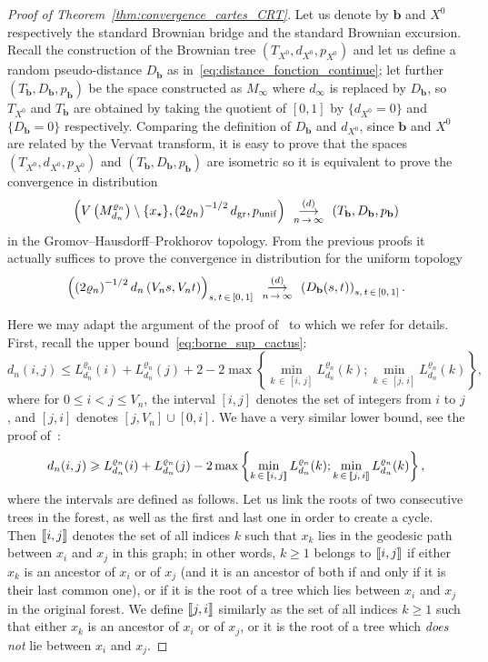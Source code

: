 \documentclass[10pt]{amsart}
\theoremstyle{definition}\newtheorem{defi}[theo]{Definition}\newtheorem{rema}[theo]{Remark}\newtheorem{exam}[theo]{Example}\newtheorem{exem}[theo]{Example}\newtheorem{nota}[theo]{Notation}
\newcommand{\llbracket}{\mathopen{[\mkern -2.7mu[}}
\newcommand{\rrbracket}{\mathclose{]\mkern -2.7mu]}}
\newcommand{\1}{\ensembles{1}}
\newcommand{\bb}{\mathbf{b}}
\renewcommand{\le}{\leqslant}
\renewcommand{\ge}{\geqslant}
\newcommand{\CRT}{T}
\newcommand{\dCRT}{d}
\newcommand{\pCRT}{p}
\newcommand{\mn}{M_{d_n}^{\varrho_n}}
\newcommand{\dgr}{d_{\mathrm{gr}}}
\newcommand{\pgr}{p_{\mathrm{unif}}}
\newcommand{\Lfn}{L_{d_n}^{\varrho_n}}
\newcommand{\vertices}{V}
\newcommand{\cvloi}[1][n]{\enskip\mathop{\longrightarrow}^{(d)}_{#1\,\to\, \infty}\enskip}
\providecommand{\?}{}
\begin{document}
\begin{proof}[Proof of Theorem~\ref{thm:convergence_cartes_CRT}]
Let us denote by $\bb$ and $X^0$ respectively the standard Brownian bridge and the standard Brownian excursion. Recall the construction of the Brownian tree $(\CRT_{X^0}, \dCRT_{X^0}, \pCRT_{X^0})$ and let us define a random pseudo-distance $D_{\bb}$ as in~\eqref{eq:distance_fonction_continue}; let further $(\CRT_{\bb}, D_{\bb}, p_{\bb})$ be the space constructed as $M_\infty$ where $d_\infty$ is replaced by $D_{\bb}$, so $\CRT_{X^0}$ and $\CRT_{\bb}$ are obtained by taking the quotient of $[0,1]$ by $\{\dCRT_{X^0} = 0\}$ and $\{D_{\bb} = 0\}$ respectively. Comparing the definition of $D_{\bb}$ and $\dCRT_{X^0}$, since $\bb$ and $X^0$ are related by the Vervaat transform, it is easy to prove that the spaces $(\CRT_{X^0}, \dCRT_{X^0}, \pCRT_{X^0})$ and $(\CRT_{\bb}, D_{\bb}, p_{\bb})$ are isometric so it is equivalent to prove the convergence in distribution
\[
\left(V\left(\mn\right)\setminus\{x_\star\}, \left(2\varrho_n\right)^{-1/2} \dgr, \pgr\right) \cvloi \left(\CRT_{\bb}, D_{\bb}, p_{\bb}\right)
\]
in the Gromov--Hausdorff--Prokhorov topology. From the previous proofs it actually suffices to prove the convergence in distribution for the uniform topology
\begin{equation}\label{eq:cv_distance_carte_arbre}
\left(\left(2\varrho_n\right)^{-1/2} d_n\left(\vertices_n s, \vertices_n t\right)\right)_{s,\,t \,\in\,[0,\,1]} \cvloi \left(D_{\bb}(s,t)\right)_{s,\,t \,\in\,[0,\,1]}.
\end{equation}

Here we may adapt the argument of the proof of~\cite[Theorem~5]{Bet15} to which we refer for details. First, recall the upper bound~\eqref{eq:borne_sup_cactus}:
\[
d_n(i,j) \le \Lfn(i) + \Lfn(j) + 2 - 2 \max\left\{\min_{k\,\in\,[i,\,j]} \Lfn(k); \min_{k\,\in\,[j,\,i]} \Lfn(k)\right\},
\]
where for $0 \le i < j \le \vertices_n$, the interval $[i, j]$ denotes the set of integers from $i$ to $j$, and $[j,i]$ denotes $[j, \vertices_n] \cup [0, i]$. We have a very similar lower bound, see the proof of~\cite[Corollary~4.4]{CLGM13}:
\begin{equation}\label{eq:borne_inf_cactus}
d_n(i,j) \ge \Lfn(i) + \Lfn(j) - 2 \max\left\{\min_{k \,\in\,\llbracket i,\,j\rrbracket} \Lfn(k); \min_{k\,\in \,\llbracket j,\,i\rrbracket} \Lfn(k)\right\},
\end{equation}
where the intervals are defined as follows. Let us link the roots of two consecutive trees in the forest, as well as the first and last one in order to create a cycle. Then $\llbracket i, j\rrbracket$ denotes the set of all indices $k$ such that $x_k$ lies in the geodesic path between $x_i$ and $x_j$ in this graph; in other words, $k \ge 1$ belongs to $\llbracket i, j\rrbracket$ if either $x_k$ is an ancestor of $x_i$ or of $x_j$ (and it is an ancestor of both if and only if it is their last common one), or if it is the root of a tree which lies between $x_i$ and $x_j$ in the original forest. We define $\llbracket j, i \rrbracket$ similarly as the set of all indices $k \ge 1$ such that either $x_k$ is an ancestor of $x_i$ or of $x_j$, or it is the root of a tree which \emph{does not} lie between $x_i$ and $x_j$.



\end{proof}
\end{document}
